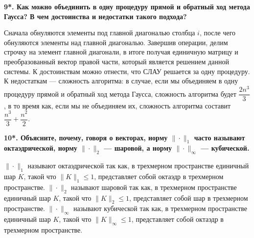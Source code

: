 \documentclass[12pt, a4paper]{article}
\begin{document}
\textbf{ 9*. Как можно объединить в одну процедуру прямой и обратный ход метода Гаусса? В чем достоинства и недостатки такого подхода? }

Сначала обнуляются элементы под главной диагональю столбца $i$, после чего обнуляются элементы над главной диагональю. Завершив операции, делим строчку на элемент главной диагонали, в итоге получая единичную матрицу и преобразованный вектор правой части, который является решением данной системы.
К достоинствам можно отнести, что СЛАУ решается за одну процедуру. К недостаткам --- сложность алгоритма: в случае, если мы объединяем в одну процедуру прямой и обратный ход метода Гаусса, сложность алгоритма будет $ \dfrac{2 n^3}{3} $, в то время как, если мы не объединяем их, сложность алгоритма составит $ \dfrac{ n^3}{3} + \dfrac{n^2}{2} $.


\textbf{10*. Объясните, почему, говоря о векторах, норму $ \| \cdot \| _1$ часто называют октаэдрической, норму $ \| \cdot \|_2$ — шаровой, а норму $ \| \cdot \|_{\infty}$ — кубической. }


$ \| \cdot \| _1$ называют октаэдрической так как, в трехмерном пространстве единичный шар $K$, такой что $ \| K \| _1 \leq  1$, представляет собой октаэдр в трехмерном пространстве. 
$ \| \cdot \| _2$ называют шаровой так как, в трехмерном пространстве единичный шар $K$, такой что $ \| K \| _2 \leq 1$, представляет собой шар в трехмерном пространстве. 
$ \| \cdot \|_{\infty}$ называют кубической так как, в трехмерном пространстве единичный шар $K$, такой что $ \| K \| _{\infty} \leq 1$, представляет собой октаэдр в трехмерном пространстве. 

\newpage
\end{document}
